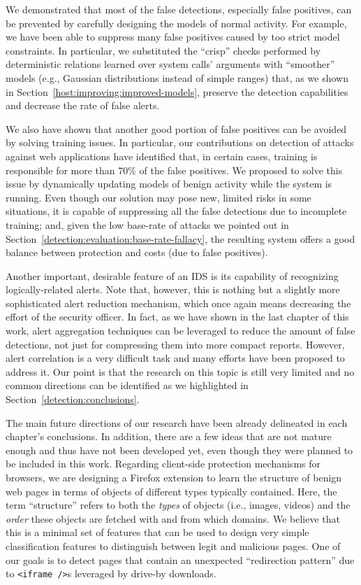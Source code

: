 We demonstrated that most of the false detections, especially false positives, can be prevented by carefully designing the models of normal activity. For example, we have been able to suppress many false positives caused by too strict model constraints. In particular, we substituted the ``crisp'' checks performed by deterministic relations learned over system calls' arguments with ``smoother'' models (e.g., Gaussian distributions instead of simple ranges) that, as we shown in Section~\ref{host:improving:improved-models}, preserve the detection capabilities and decrease the rate of false alerts.

We also have shown that another good portion of false positives can be avoided by solving training issues. In particular, our contributions on detection of attacks against web applications have identified that, in certain cases, training is responsible for more than 70\% of the false positives. We proposed to solve this issue by dynamically updating models of benign activity while the system is running. Even though our solution may pose new, limited risks in some situations, it is capable of suppressing all the false detections due to incomplete training; and, given the low base-rate of attacks we pointed out in Section~\ref{detection:evaluation:base-rate-fallacy}, the resulting system offers a good balance between protection and costs (due to false positives).

Another important, desirable feature of an \ac{IDS} is its capability of recognizing logically\hyp{}related alerts. Note that, however, this is nothing but a slightly more sophisticated alert reduction mechanism, which once again means decreasing the effort of the security officer. In fact, as we have shown in the last chapter of this work, alert aggregation techniques can be leveraged to reduce the amount of false detections, not just for compressing them into more compact reports. However, alert correlation is a very difficult task and many efforts have been proposed to address it. Our point is that the research on this topic is still very limited and no common directions can be identified as we highlighted in Section~\ref{detection:conclusions}.

\medskip

The main future directions of our research have been already delineated in each chapter's conclusions. In addition, there are a few ideas that are not mature enough and thus have not been developed yet, even though they were planned to be included in this work. Regarding client-side protection mechanisms for browsers, we are designing a \textsf{Firefox} extension to learn the structure of benign web pages in terms of objects of different types typically contained. Here, the term ``structure'' refers to both the \emph{types} of objects (i.e., images, videos) and the \emph{order} these objects are fetched with and from which domains. We believe that this is a minimal set of features that can be used to design very simple classification features to distinguish between legit and malicious pages. One of our goals is to detect pages that contain an unexpected ``redirection pattern'' due to \texttt{<iframe />}s leveraged by drive-by downloads.

